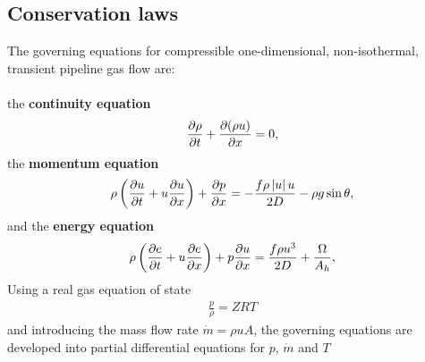 \subsection{Conservation laws}
The governing equations for compressible one-dimensional, non-isothermal, transient pipeline gas flow are: \\\\
the \textbf{continuity equation}
\begin{align}
    \pdt{\rho} + \pdx{(\rho u)} = 0
, \label{eq:contEq}
\end{align}
the \textbf{momentum equation} \cite{Daneshyar1976OneDimensional}
\begin{align}
    \rho\del{\pdt{u} + u \pdx{u}} + \pdx{p} = -\frac{f\rho \abs{u} u}{2D} - \rho g \sin \theta
, \label{eq:momEq}
\end{align}
and the \textbf{energy equation} \cite{White2006Viscous}
\begin{align}
    \rho\del{\pdt{e} + u\pdx{e}} + p\pdx{u} = \frac{f\rho u^3}{2D} + \frac{\Omega}{A_h}
, \label{eq:enEq}
\end{align}
Using a real gas equation of state
\begin{align}
    \frac{p}{\rho} = ZRT
\end{align}
and introducing the mass flow rate $\dot m = \rho u A$, the governing equations are developed into partial differential equations for $p$, $\dot m$ and $T$
